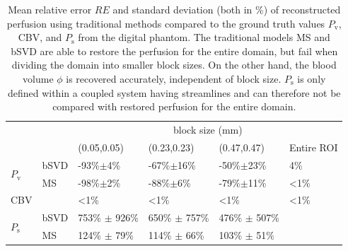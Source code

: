 \documentclass[journal,twocolumn]{IEEEtran}
\newcommand{\Perfv}{P_{\mathrm{v}}}
\newcommand{\Perfs}{P_{\mathrm{s}}}
\begin{document}
	\begin{table}[h!tb]
		\scriptsize
		\caption{Mean relative error $RE$ and standard deviation (both in \%) of reconstructed perfusion using traditional methods compared to the ground truth values $\Perfv$, CBV, and $\Perfs$ from the digital phantom. The traditional models MS and bSVD are able to restore the perfusion for the entire domain, but fail when dividing the domain into smaller block sizes. On the other hand, the blood volume $\phi$ is recovered accurately, independent of block size. $\Perfs$ is only defined within a coupled system having streamlines and can therefore not be compared with restored perfusion for the entire domain.
		} 
		\centering
		\begin{tabular}{p{.3cm} l l l l l}
			& & \multicolumn{4}{c}{block size (\si{\mm})} \\
										& 		& (0.05,0.05) 		& (0.23,0.23) 	& 	(0.47,0.47)			& Entire ROI \\ \toprule
			\multirow{2}{*}{$\Perfv$}	& bSVD 	& -93\%$\pm$4\% 	& -67\%$\pm$16\%	& -50\%$\pm$23\%	& 4\% 	\\ 
									   	& MS 	& -98\%$\pm$2\% 	& -88\%$\pm$6\%		& -79\%$\pm$11\%	& <1\% 	\\ \midrule
									CBV & 		& <1\% 				& <1\% 				& <1\% 				& <1\% 	\\ \midrule
			\multirow{2}{*}{$\Perfs$}	& bSVD	& 753\% $\pm$ 926\%	& 650\% $\pm$ 757\%	& 476\% $\pm$ 507\% & 		\\
										& MS 	& 124\% $\pm$ 79\%  & 114\% $\pm$ 66\%	& 103\% $\pm$ 51\% 	& 		\\
		\end{tabular}

		\label{tab:resultsSim}
	\end{table}
\end{document}

